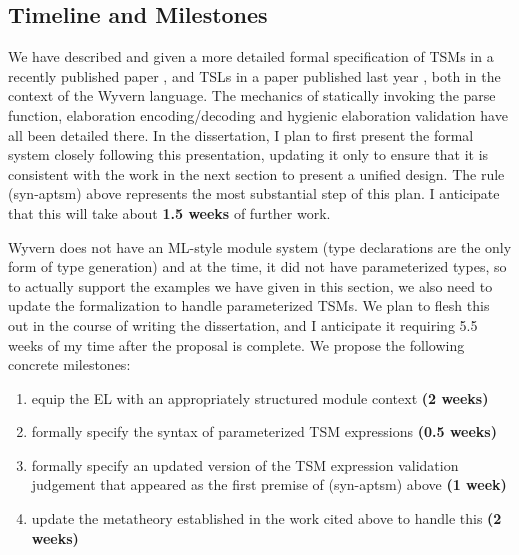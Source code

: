 \subsection{Timeline and Milestones}\label{sec:syntax-timeline}
We have described and given a more detailed formal specification of TSMs in a recently published paper \cite{sac15}, and TSLs in a paper published last year \cite{TSLs}, both in the context of the Wyvern language. The mechanics of statically invoking the parse function, elaboration encoding/decoding and hygienic elaboration validation have all been detailed there. In the dissertation, I plan to first present the formal system closely following this presentation, updating it only to ensure that it is consistent with the work in the next section to present a unified design. The rule (syn-aptsm) above represents the most substantial step of this plan. I anticipate that this will take about \textbf{1.5 weeks} of further work.

Wyvern does not have an ML-style module system (type declarations are the only form of type generation) and at the time, it did not have parameterized types, so to actually support the examples we have given in this section, we also need to update the formalization to handle parameterized TSMs. We plan to flesh this out in the course of writing the dissertation, and I anticipate it requiring 5.5 weeks of my time after the proposal is complete. We propose the following concrete milestones:

\begin{enumerate}
\item equip the EL with an appropriately structured module context \textbf{(2 weeks)}
\item formally specify the syntax of parameterized TSM expressions \textbf{(0.5 weeks)}
\item formally specify an updated version of the TSM expression validation judgement that appeared as the first premise of (syn-aptsm) above \textbf{(1 week)}
\item update the metatheory established in the work cited above to handle this \textbf{(2 weeks)}
\end{enumerate}

